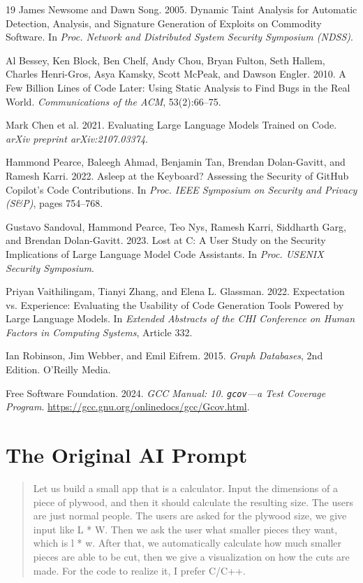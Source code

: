 \documentclass[11pt,twocolumn]{article}
\begin{document}
\begin{thebibliography}{19}
James Newsome and Dawn Song. 2005.
\newblock Dynamic Taint Analysis for Automatic Detection, Analysis, and
Signature Generation of Exploits on Commodity Software.
\newblock In \emph{Proc. Network and Distributed System Security
Symposium (NDSS)}.

Al Bessey, Ken Block, Ben Chelf, Andy Chou, Bryan Fulton, Seth Hallem,
Charles Henri-Gros, Asya Kamsky, Scott McPeak, and Dawson Engler. 2010.
\newblock A Few Billion Lines of Code Later: Using Static Analysis to
Find Bugs in the Real World.
\newblock \emph{Communications of the ACM}, 53(2):66--75.

Mark Chen et al. 2021.
\newblock Evaluating Large Language Models Trained on Code.
\newblock \emph{arXiv preprint arXiv:2107.03374}.

Hammond Pearce, Baleegh Ahmad, Benjamin Tan, Brendan Dolan-Gavitt, and
Ramesh Karri. 2022.
\newblock Asleep at the Keyboard? Assessing the Security of GitHub
Copilot's Code Contributions.
\newblock In \emph{Proc. IEEE Symposium on Security and Privacy (S\&P)},
pages 754--768.

Gustavo Sandoval, Hammond Pearce, Teo Nys, Ramesh Karri, Siddharth Garg,
and Brendan Dolan-Gavitt. 2023.
\newblock Lost at C: A User Study on the Security Implications of Large
Language Model Code Assistants.
\newblock In \emph{Proc. USENIX Security Symposium}.

Priyan Vaithilingam, Tianyi Zhang, and Elena L. Glassman. 2022.
\newblock Expectation vs. Experience: Evaluating the Usability of Code
Generation Tools Powered by Large Language Models.
\newblock In \emph{Extended Abstracts of the CHI Conference on Human
Factors in Computing Systems}, Article 332.

Ian Robinson, Jim Webber, and Emil Eifrem. 2015.
\newblock \emph{Graph Databases}, 2nd Edition.
\newblock O'Reilly Media.

Free Software Foundation. 2024.
\newblock \emph{GCC Manual: 10. \texttt{gcov}---a Test Coverage Program}.
\newblock \url{https://gcc.gnu.org/onlinedocs/gcc/Gcov.html}.
\end{thebibliography}

\appendix
\section{The Original AI Prompt}

\begin{quote}
Let us build a small app that is a calculator. Input the dimensions
of a piece of plywood, and then it should calculate the resulting
size. The users are just normal people. The users are asked for the
plywood size, we give input like L * W. Then we ask the user what
smaller pieces they want, which is l * w. After that, we automatically
calculate how much smaller pieces are able to be cut, then we give a
visualization on how the cuts are made. For the code to realize it,
I prefer C/C++.
\end{quote}
\end{document}
